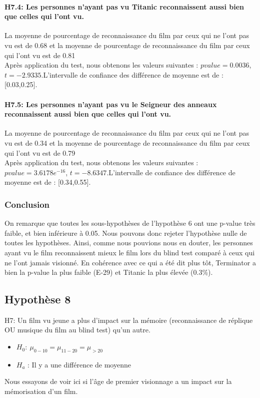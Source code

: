 \documentclass{article} %
\begin{document}
\paragraph{H7.4: Les personnes n’ayant pas vu Titanic reconnaissent aussi bien que celles qui l’ont vu. \\}
La moyenne de pourcentage de reconnaissance du film par ceux qui ne l'ont pas vu est de 0.68 et la moyenne de pourcentage de reconnaissance du film par ceux qui l'ont vu est de 0.81\\
Après application du test, nous obtenons les valeurs suivantes : $pvalue =  0.0036$, $t = -2.9335$.L'intervalle de confiance des différence de moyenne est de : [0.03,0.25].

\paragraph{H7.5: Les personnes n’ayant pas vu le Seigneur des anneaux reconnaissent aussi bien que celles qui l’ont vu.\\}
La moyenne de pourcentage de reconnaissance du film par ceux qui ne l'ont pas vu est de 0.34 et la moyenne de pourcentage de reconnaissance du film par ceux qui l'ont vu est de 0.79\\
Après application du test, nous obtenons les valeurs suivantes : $pvalue =   3.6178e^{-16}$, $t = -8.6347$.L'intervalle de confiance des différence de moyenne est de : [0.34,0.55].

\subsubsection{Conclusion}
On remarque que toutes les sous-hypothèses de l'hypothèse 6 ont une p-value très faible, et bien inférieure à 0.05. Nous pouvons donc rejeter l'hypothèse nulle de toutes les hypothèses. Ainsi, comme nous pouvions nous en douter, les personnes ayant vu le film reconnaissent mieux le film lors du blind test comparé à ceux qui ne l'ont jamais visionné. 
En cohérence avec ce qui a été dit plus tôt, Terminator a bien la p-value la plus faible (E-29) et Titanic la plus élevée (0.3\%).

\subsection{Hypothèse 8}
H7: Un film vu jeune a plus d’impact sur la mémoire (reconnaissance de réplique OU musique du film au blind test) qu’un autre.
\begin{itemize}
	\item $H_0: \ \mu_{0-10} = \mu_{11-20}= \mu_{>20}$
	\item $H_a$ : Il y a une différence de moyenne
\end{itemize}
Nous essayons de voir ici si l'âge de premier visionnage a un impact sur la mémorisation d’un film.
\newpage
\end{document}
